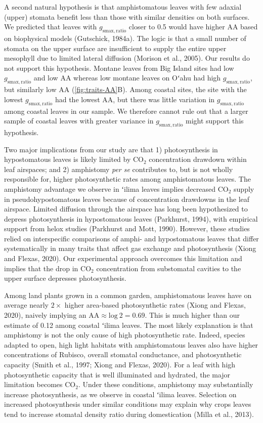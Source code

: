 \documentclass[
  letterpaper,
  DIV=11,
  numbers=noendperiod]{scrartcl}
\begin{document}
A second natural hypothesis is that amphistomatous leaves with few
adaxial (upper) stomata benefit less than those with similar densities
on both surfaces. We predicted that leaves with
\(g_\mathrm{smax,ratio}\) closer to 0.5 would have higher
\(\mathrm{AA}\) based on biophysical models (Gutschick, 1984a). The
logic is that a small number of stomata on the upper surface are
insufficient to supply the entire upper mesophyll due to limited lateral
diffusion (Morison et al., 2005). Our results do not support this
hypothesis. Montane leaves from Big Island sites had low
\(g_\mathrm{smax,ratio}\) and low \(\mathrm{AA}\) whereas low montane
leaves on Oʻahu had high \(g_\mathrm{smax,ratio}\), but similarly low
\(\mathrm{AA}\) (\autoref{fig:traits-AA}B). Among coastal sites, the
site with the lowest \(g_\mathrm{smax,ratio}\) had the lowest
\(\mathrm{AA}\), but there was little variation in
\(g_\mathrm{smax,ratio}\) among coastal leaves in our sample. We
therefore cannot rule out that a larger sample of coastal leaves with
greater variance in \(g_\mathrm{smax,ratio}\) might support this
hypothesis.

Two major implications from our study are that 1) photosynthesis in
hypostomatous leaves is likely limited by CO\(_2\) concentration
drawdown within leaf airspaces; and 2) amphistomy \emph{per se}
contributes to, but is not wholly responsible for, higher photosynthetic
rates among amphistomatous leaves. The amphistomy advantage we observe
in ʻilima leaves implies decreased CO\(_2\) supply in
pseudohypostomatous leaves because of concentration drawdowns in the
leaf airspace. Limited diffusion through the airspace has long been
hypothesized to depress photosynthesis in hypostomatous leaves
(Parkhurst, 1994), with empirical support from helox studies (Parkhurst
and Mott, 1990). However, these studies relied on interspecific
comparisons of amphi- and hypostomatous leaves that differ
systematically in many traits that affect gas exchange and
photosynthesis (Xiong and Flexas, 2020). Our experimental approach
overcomes this limitation and implies that the drop in CO\(_2\)
concentration from substomatal cavities to the upper surface depresses
photosynthesis.

Among land plants grown in a common garden, amphistomatous leaves have
on average nearly \(2\times\) higher area-based photosynthetic rates
(Xiong and Flexas, 2020), naively implying an
\(\mathrm{AA} \approx \text{log}~2 = 0.69\). This is much higher than
our estimate of 0.12 among coastal ʻilima leaves. The most likely
explanation is that amphistomy is not the only cause of high
photosynthetic rate. Indeed, species adapted to open, high light
habitats with amphistomatous leaves also have higher concentrations of
Rubisco, overall stomatal conductance, and photosynthetic capacity
(Smith et al., 1997; Xiong and Flexas, 2020). For a leaf with high
photosynthetic capacity that is well illuminated and hydrated, the major
limitation becomes CO\(_2\). Under these conditions, amphistomy may
substantially increase photosynthesis, as we observe in coastal ʻilima
leaves. Selection on increased photosynthesis under similar conditions
may explain why crops leaves tend to increase stomatal density ratio
during domestication (Milla et al., 2013).
\end{document}
